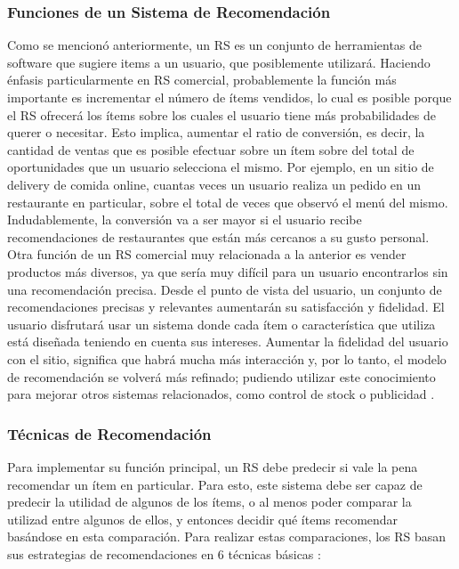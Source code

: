 \subsubsection{Funciones de un Sistema de Recomendación}
Como se mencionó anteriormente, un RS es un conjunto de herramientas de software que sugiere items a un usuario, que posiblemente utilizará. Haciendo énfasis particularmente en RS comercial, probablemente la función más importante es incrementar el número de ítems vendidos, lo cual es posible porque el RS ofrecerá los ítems sobre los cuales el usuario tiene más probabilidades de querer o necesitar. Esto implica, aumentar el ratio de conversión, es decir, la cantidad de ventas que es posible efectuar sobre un ítem sobre del total de oportunidades que un usuario selecciona el mismo. Por ejemplo, en un sitio de delivery de comida online, cuantas veces un usuario realiza un pedido en un restaurante en particular, sobre el total de veces que observó el menú del mismo. Indudablemente, la conversión va a ser mayor si el usuario recibe recomendaciones de restaurantes que están más cercanos a su gusto personal. Otra función de un RS comercial muy relacionada a la anterior es vender productos más diversos, ya que sería muy difícil para un usuario encontrarlos sin una recomendación precisa. 
Desde el punto de vista del usuario, un conjunto de recomendaciones precisas y relevantes aumentarán su satisfacción y fidelidad. El usuario disfrutará usar un sistema donde cada ítem o característica que utiliza está diseñada teniendo en cuenta sus intereses. Aumentar la fidelidad del usuario con el sitio, significa que habrá mucha más interacción y, por lo tanto, el modelo de recomendación se volverá más refinado; pudiendo utilizar este conocimiento para mejorar otros sistemas relacionados, como control de stock o publicidad \citep{ricci2011introduction}.

\subsubsection{Técnicas de Recomendación}
Para implementar su función principal, un RS debe predecir si vale la pena recomendar un ítem en particular. Para esto, este sistema debe ser capaz de predecir la utilidad de algunos de los ítems, o al menos poder comparar la utilizad entre algunos de ellos, y entonces decidir qué ítems recomendar basándose en esta comparación. Para realizar estas comparaciones, los RS basan sus estrategias de recomendaciones en 6 técnicas básicas \citep{ricci2011introduction}:

